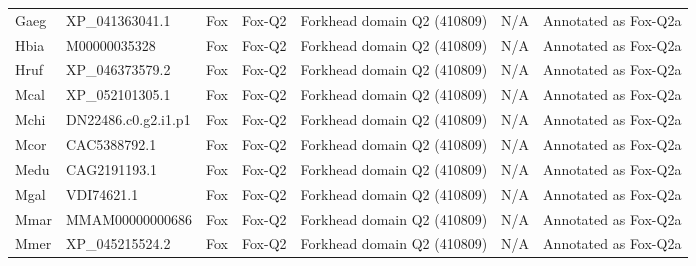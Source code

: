 \documentclass[../main.tex]{subfiles}
\begin{document}
\begin{landscape}
\begin{longtable}{lllllll}
		Gaeg           & XP\_041363041.1       & Fox            & Fox-Q2              & Forkhead domain Q2 (410809)                 & N/A                                                                    & Annotated as Fox-Q2a \\
		Hbia           & M00000035328          & Fox            & Fox-Q2              & Forkhead domain Q2 (410809)                 & N/A                                                                    & Annotated as Fox-Q2a \\
		Hruf           & XP\_046373579.2       & Fox            & Fox-Q2              & Forkhead domain Q2 (410809)                 & N/A                                                                    & Annotated as Fox-Q2a \\
		Mcal           & XP\_052101305.1       & Fox            & Fox-Q2              & Forkhead domain Q2 (410809)                 & N/A                                                                    & Annotated as Fox-Q2a \\
		Mchi           & DN22486.c0.g2.i1.p1   & Fox            & Fox-Q2              & Forkhead domain Q2 (410809)                 & N/A                                                                    & Annotated as Fox-Q2a \\
		Mcor           & CAC5388792.1          & Fox            & Fox-Q2              & Forkhead domain Q2 (410809)                 & N/A                                                                    & Annotated as Fox-Q2a \\
		Medu           & CAG2191193.1          & Fox            & Fox-Q2              & Forkhead domain Q2 (410809)                 & N/A                                                                    & Annotated as Fox-Q2a \\
		Mgal           & VDI74621.1            & Fox            & Fox-Q2              & Forkhead domain Q2 (410809)                 & N/A                                                                    & Annotated as Fox-Q2a \\
		Mmar           & MMAM00000000686       & Fox            & Fox-Q2              & Forkhead domain Q2 (410809)                 & N/A                                                                    & Annotated as Fox-Q2a \\
		Mmer           & XP\_045215524.2       & Fox            & Fox-Q2              & Forkhead domain Q2 (410809)                 & N/A                                                                    & Annotated as Fox-Q2a \\

\end{longtable}
\end{landscape}
\end{document}
